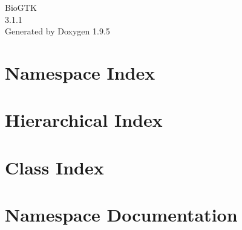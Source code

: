 \documentclass[twoside]{book}
\newcommand{\+}{\discretionary{\mbox{\scriptsize$\hookleftarrow$}}{}{}}
\newcommand{\clearemptydoublepage}{%
    \newpage{\pagestyle{empty}\cleardoublepage}%
  }
\begin{document}
  \raggedbottom
    \hypersetup{pageanchor=false,
                bookmarksnumbered=true,
                pdfencoding=unicode
               }
  \begin{titlepage}
  \vspace*{7cm}
  \begin{center}%
  {\Large Bio\+GTK}\\
  [1ex]\large 3.\+1.\+1 \\
  \vspace*{1cm}
  {\large Generated by Doxygen 1.9.5}\\
  \end{center}
  \end{titlepage}
  \clearemptydoublepage
  \tableofcontents
  \clearemptydoublepage
  \hypersetup{pageanchor=true}
\chapter{Namespace Index}

\chapter{Hierarchical Index}

\chapter{Class Index}

\chapter{Namespace Documentation}



\end{document}
